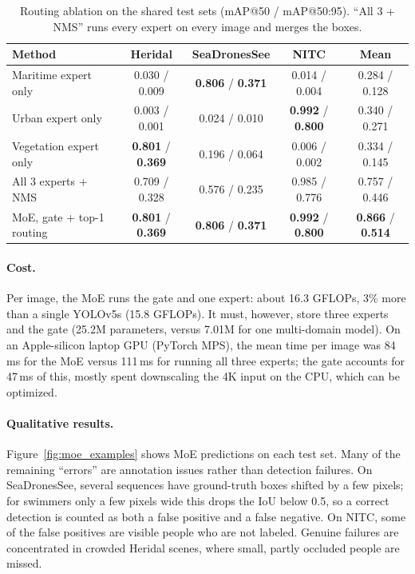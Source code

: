 \documentclass{article}
\begin{document}
\begin{table}[h]
  \caption{Routing ablation on the shared test sets (mAP@50 / mAP@50:95). ``All 3 + NMS'' runs every expert on every image and merges the boxes.}
  \label{tab:moe_ablation}
  \centering
  \small
  \begin{tabular}{lcccc}
    \toprule
    Method & Heridal & SeaDronesSee & NITC & Mean \\
    \midrule
    Maritime expert only & 0.030 / 0.009 & \textbf{0.806} / \textbf{0.371} & 0.014 / 0.004 & 0.284 / 0.128 \\
    Urban expert only & 0.003 / 0.001 & 0.024 / 0.010 & \textbf{0.992} / \textbf{0.800} & 0.340 / 0.271 \\
    Vegetation expert only & \textbf{0.801} / \textbf{0.369} & 0.196 / 0.064 & 0.006 / 0.002 & 0.334 / 0.145 \\
    All 3 experts + NMS & 0.709 / 0.328 & 0.576 / 0.235 & 0.985 / 0.776 & 0.757 / 0.446 \\
    MoE, gate + top-1 routing & \textbf{0.801} / \textbf{0.369} & \textbf{0.806} / \textbf{0.371} & \textbf{0.992} / \textbf{0.800} & \textbf{0.866} / \textbf{0.514} \\
    \bottomrule
  \end{tabular}
\end{table}

\paragraph{Cost.} Per image, the MoE runs the gate and one expert: about 16.3 GFLOPs, 3\% more than a single YOLOv5s (15.8 GFLOPs). It must, however, store three experts and the gate (25.2M parameters, versus 7.01M for one multi-domain model). On an Apple-silicon laptop GPU (PyTorch MPS), the mean time per image was 84\,ms for the MoE versus 111\,ms for running all three experts; the gate accounts for 47\,ms of this, mostly spent downscaling the 4K input on the CPU, which can be optimized.

\paragraph{Qualitative results.} Figure~\ref{fig:moe_examples} shows MoE predictions on each test set. Many of the remaining ``errors'' are annotation issues rather than detection failures. On SeaDronesSee, several sequences have ground-truth boxes shifted by a few pixels; for swimmers only a few pixels wide this drops the IoU below 0.5, so a correct detection is counted as both a false positive and a false negative. On NITC, some of the false positives are visible people who are not labeled. Genuine failures are concentrated in crowded Heridal scenes, where small, partly occluded people are missed.
\end{document}
